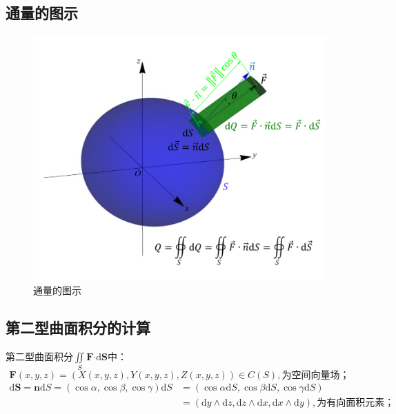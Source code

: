 \documentclass[12pt,UTF8,fleqn]{ctexart}
\newcommand{\md}[1]{\mathrm d#1}
\newcommand{\BSIInt}[2]{\iint\limits_{#1}#2}
\begin{document}
\subsection{通量的图示}
\begin{figure}[H]
\begin{center}
\includegraphics[height=0.5\textheight,angle=0]{Figures20190613/Flux.pdf}
\end{center}
\caption{通量的图示}
\end{figure}
\subsection{第二型曲面积分的计算}
第二型曲面积分$\BSIInt S{\bm F\bm\cdot\md\bm S}$中：
\setlength{\mathindent}{1cm}
\[\bm F(x,y,z)=(X(x,y,z),Y(x,y,z),Z(x,y,z))\in C(S),\text{为空间向量场；}\]
\[\begin{aligned}
\md\bm S=\bm n\md S=(\cos\alpha,\cos\beta,\cos\gamma)\md S&=(\cos\alpha\md S,\cos\beta\md S,\cos\gamma\md S)\\&=(\md y\wedge\md z,\md z\wedge\md x,\md x\wedge\md y),\text{为有向面积元素；}
\end{aligned}\]
\end{document}
